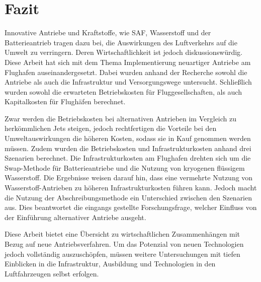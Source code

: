 \chapter{Fazit}
\label{ch:Fazit}
Innovative Antriebe und Kraftstoffe, wie SAF, Wasserstoff und der Batterieantrieb tragen dazu bei, die Auswirkungen des Luftverkehrs auf die Umwelt zu verringern.
Deren Wirtschaftlichkeit ist jedoch diskussionswürdig.
Diese Arbeit hat sich mit dem Thema Implementierung neuartiger Antriebe am Flughafen auseinandergesetzt. 
Dabei wurden anhand der Recherche sowohl die Antriebe als auch die Infrastruktur und Versorgungswege untersucht.
Schließlich wurden sowohl die erwarteten Betriebskosten für Fluggesellschaften, als auch Kapitalkosten für Flughäfen berechnet.

Zwar werden die Betriebskosten bei alternativen Antrieben im Vergleich zu herkömmlichen Jets steigen, 
jedoch rechtfertigen die Vorteile bei den Umweltauswirkungen die höheren Kosten, sodass sie in Kauf genommen werden müssen.
Zudem wurden die Betriebskosten und Infrastrukturkosten anhand drei Szenarien berechnet. 
Die Infrastrukturkosten am Flughafen drehten sich um die Swap-Methode für Batterieantriebe und die Nutzung von kryogenen flüssigem Wasserstoff.
Die Ergebnisse weisen darauf hin, dass eine vermehrte Nutzung von Wasserstoff-Antrieben zu höheren Infrastrukturkosten führen kann.
Jedoch macht die Nutzung der Abschreibungsmethode ein Unterschied zwischen den Szenarien aus. 
Dies beantwortet die eingangs gestellte Forschungsfrage, welcher Einfluss von der Einführung alternativer Antriebe ausgeht.

Diese Arbeit bietet eine Übersicht zu wirtschaftlichen Zusammenhängen mit Bezug auf neue Antriebsverfahren.
Um das Potenzial von neuen Technologien jedoch vollständig auszuschöpfen, müssen weitere Untersuchungen 
mit tiefen Einblicken in die Infrastruktur, Ausbildung und Technologien in den Luftfahrzeugen selbst erfolgen.
